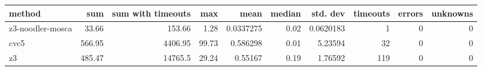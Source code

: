 \begin{tabular}{lrrrrrrrrr}
\hline
 method           &    sum &   sum with timeouts &   max &      mean &   median &   std. dev &   timeouts &   errors &   unknowns \\
\hline
 z3-noodler-mosca &  33.66 &              153.66 &  1.28 & 0.0337275 &     0.02 &  0.0620183 &          1 &        0 &          0 \\
 cvc5             & 566.95 &             4406.95 & 99.73 & 0.586298  &     0.01 &  5.23594   &         32 &        0 &          0 \\
 z3               & 485.47 &            14765.5  & 29.24 & 0.55167   &     0.19 &  1.76592   &        119 &        0 &          0 \\
\hline
\end{tabular}
